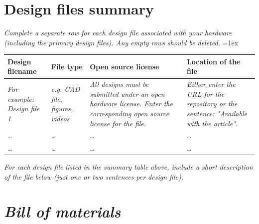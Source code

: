 \documentclass[11pt, letterpaper]{article}
\begin{document}
\section{Design files summary}
\textit{Complete a separate row for each design file associated with your hardware (including the primary design files). Any empty rows should be deleted.}
\vskip 0.1cm
\tabulinesep=1ex
\begin{tabu} to \linewidth {|X|X|X[1.5,1]|X[1.5,1]|} 
\hline
\textbf{Design filename} & \textbf{File type} & \textbf{Open source license} & \textbf{Location of the file} \\\hline
\textit{For example: Design file 1} & \textit{e.g. CAD file, figures, videos} & \textit{All designs must be submitted under an open hardware license. Enter the corresponding open source license for the file.} & \textit{Either enter the URL for the repository or the sentence: "Available with the article".}  \\\hline
\dots & \dots & \dots & \dots \\\hline
\dots & \dots & \dots & \dots \\\hline
\end{tabu}


\vskip 0.3cm
\noindent
\textit{For each design file listed in the summary table above, include a short description of the file below (just one or two sentences per design file).}


\section*{\textit{Bill of materials}}

\end{document}
